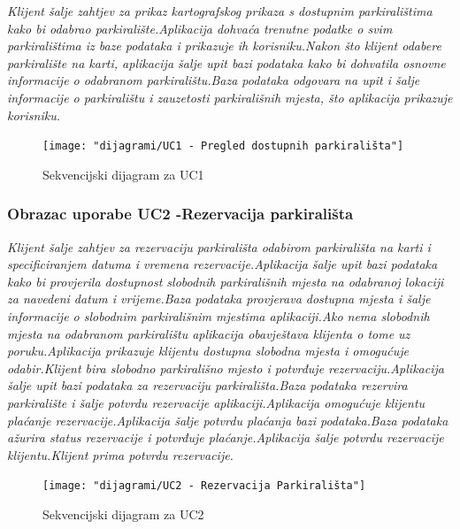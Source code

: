 {\textit{Klijent šalje zahtjev za prikaz kartografskog prikaza s dostupnim parkiralištima kako bi odabrao parkiralište.Aplikacija dohvaća trenutne podatke o svim parkiralištima iz baze podataka i prikazuje ih korisniku.Nakon što klijent odabere parkiralište na karti, aplikacija šalje upit bazi podataka kako bi dohvatila osnovne informacije o odabranom parkiralištu.Baza podataka odgovara na upit i šalje informacije o parkiralištu i zauzetosti parkirališnih mjesta, što aplikacija prikazuje korisniku.}

\begin{figure}[!htb]
	\centering
	\texttt{[image: "dijagrami/UC1 - Pregled dostupnih parkirališta"]}
	\caption{Sekvencijski dijagram za UC1}
	\label{fig:uc1---pregled-dostupnih-parkiralista}
\end{figure}


\subsubsection{Obrazac uporabe UC2 -Rezervacija parkirališta}

\textit{Klijent šalje zahtjev za rezervaciju parkirališta odabirom parkirališta na karti i specificiranjem datuma i vremena rezervacije.Aplikacija šalje upit bazi podataka kako bi provjerila dostupnost slobodnih parkirališnih mjesta na odabranoj lokaciji za navedeni datum i vrijeme.Baza podataka provjerava dostupna mjesta i šalje informacije o slobodnim parkirališnim mjestima aplikaciji.Ako nema slobodnih mjesta na odabranom parkiralištu aplikacija obavještava klijenta o tome uz poruku.Aplikacija prikazuje klijentu dostupna slobodna mjesta i omogućuje odabir.Klijent bira slobodno parkirališno mjesto i potvrđuje rezervaciju.Aplikacija šalje upit bazi podataka za rezervaciju parkirališta.Baza podataka rezervira parkiralište i šalje potvrdu rezervacije aplikaciji.Aplikacija omogućuje klijentu plaćanje rezervacije.Aplikacija šalje potvrdu plaćanja bazi podataka.Baza podataka ažurira status rezervacije i potvrđuje plaćanje.Aplikacija šalje potvrdu rezervacije klijentu.Klijent prima potvrdu rezervacije.}


\begin{figure}
	\centering
	\texttt{[image: "dijagrami/UC2 - Rezervacija Parkirališta"]}
	\caption{Sekvencijski dijagram za UC2}
	\label{fig:uc2---rezervacija-parkiralista}
\end{figure}

\newpage

}
